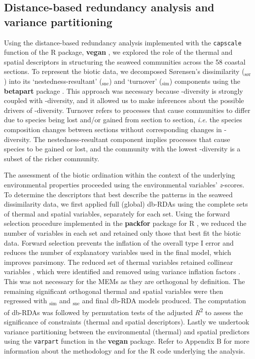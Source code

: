 \documentclass[utf8]{frontiersSCNS} %
\begin{document}
\subsection{Distance-based redundancy analysis and variance partitioning}

Using the distance-based redundancy analysis \citep[db-RDA;][]{Minchin1987} implemented with the \texttt{capscale} function of the R package, \textbf{vegan} \citep{oksanen2016vegan}, we explored the role of the thermal and spatial descriptors in structuring the seaweed communities across the 58 coastal sections. To represent the biotic data, we decomposed Sørensen's dissimilarity (\textbeta$_{\text{sør}}$) into its `nestedness-resultant' (\textbeta$_{\text{sne}}$) and `turnover' (\textbeta$_{\text{sim}}$) components \citep{Baselga2010} using the \textbf{betapart} package \citep{Baselga2013}. This approach was necessary because \textbeta-diversity is strongly coupled with \textalpha-diversity, and it allowed us to make inferences about the possible drivers of \textbeta-diversity. Turnover refers to processes that cause communities to differ due to species being lost and/or gained from section to section, \emph{i.e.} the species composition changes between sections without corresponding changes in \textalpha-diversity. The nestedness-resultant component implies processes that cause species to be gained or lost, and the community with the lowest \textalpha-diversity is a subset of the richer community.

The assessment of the biotic ordination within the context of the underlying environmental properties proceeded using the environmental variables' \emph{z}-scores. To determine the descriptors that best describe the patterns in the seaweed dissimilarity data, we first applied full (global) db-RDAs using the complete sets of thermal and spatial variables, separately for each set. Using the forward selection procedure implemented in the \textbf{packfor} package for R \citep{Blanchet2008}, we reduced the number of variables in each set and retained only those that best fit the biotic data. Forward selection prevents the inflation of the overall type I error and reduces the number of explanatory variables used in the final model, which improves parsimony. The reduced set of thermal variables retained collinear variables \citep{Graham2003}, which were identified and removed using variance inflation factors \citep[VIF;][]{Dormann2013}. This was not necessary for the MEMs as they are orthogonal by definition. The remaining significant orthogonal thermal and spatial variables were then regressed with \textbeta$_{\text{sim}}$ and \textbeta$_{\text{sne}}$ and final db-RDA models produced. The computation of db-RDAs was followed by permutation tests of the adjusted \emph{R}\textsuperscript{2} to assess the significance of constraints (thermal and spatial descriptors). Lastly we undertook variance partitioning \citep{Peres-Neto2006,PeresNeto2010} between the environmental (thermal) and spatial predictors using the \texttt{varpart} function in the \textbf{vegan} package. Refer to Appendix B for more information about the methodology and for the R code underlying the analysis.
\end{document}
